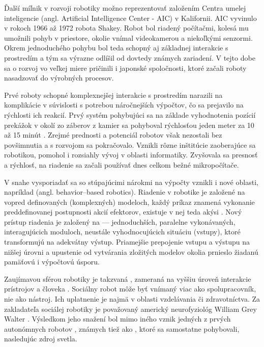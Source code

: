 Ďalší míľnik v rozvoji robotiky možno reprezentovať založením Centra umelej inteligencie (angl. Artificial Intelligence Center - AIC) v Kalifornii. AIC vyvinulo v rokoch 1966 až 1972 robota Shakey. Robot bol riadený počítačmi, kolesá mu umožnili pohyb v priestore, okolie vnímal videokamerou a niekoľkými senzormi. Okrem jednoduchého pohybu bol teda schopný aj základnej interakcie s prostredím a tým sa výrazne odlíšil od dovtedy známych zariadení. V tejto dobe sa o rozvoj vo veľkej miere pričinili i japonské spoločnosti, ktoré začali roboty nasadzovať do výrobných procesov.

Prvé roboty schopné komplexnejšej interakcie s prostredím narazili na komplikácie v súvislosti s potrebou náročnejších výpočtov, čo sa prejavilo na rýchlosti ich reakcií. Prvý systém pohybujúci sa na základe vyhodnotenia pozícií prekážok v okolí zo záberov z kamier sa pohyboval rýchlosťou jeden meter za 10 až 15 minút \cite{RoboticsAndAutomationHandbook}. Zrejmé prednosti a potenciál robotov však nezostali bez povšimnutia a s rozvojom sa pokračovalo. Vznikli rôzne inštitúcie zaoberajúce sa robotikou, pomohol i rozsiahly vývoj v oblasti informatiky. Zvyšovala sa presnosť a rýchlosť, na riadenie sa začali používať dnes celkom bežné mikropočítače.

V snahe vysporiadať sa so stúpajúcimi nárokmi na výpočty vznikli i nové oblasti, napríklad  (angl. behavior--based robotics). Riadenie v  robotike je založené na vopred definovaných (komplexných) modeloch, každý príkaz znamená vykonanie preddefinovanej postupnosti akcií efektorov, existuje v nej teda akýsi  \cite{BehaviorBasedRobotics}. Nový prístup riadenia je založený na  --- jednoduchších, paralelne vykonávaných, interagujúcich moduloch, neustále vyhodnocujúcich situáciu (vstupy), ktoré transformujú na adekvátny výstup. Priamejšie prepojenie vstupu a výstupu na nižšej úrovni a upustenie od vytvárania zložitých modelov okolia prnieslo žiadanú pamäťovú i výpočtovú úsporu.

Zaujímavou sférou robotiky je takzvaná , zameraná na vyššiu úroveň interakcie prístrojov a človeka \cite{breazeal2016social}. Sociálny robot môže byť vnímaný viac ako spolupracovník, nie ako nástroj. Ich uplatnenie je najmä v oblasti vzdelávania či zdravotníctva. Za zakladateľa sociálej robotiky je považovaný americký neurofyziológ William Grey Walter \cite{WalterTortoise}. Výsledkom jeho snažení bol mimo iného vznik jedných z prvých autonómnych robotov , známych tiež ako , ktoré sa samostatne pohybovali, nasledujúc zdroj svetla.

